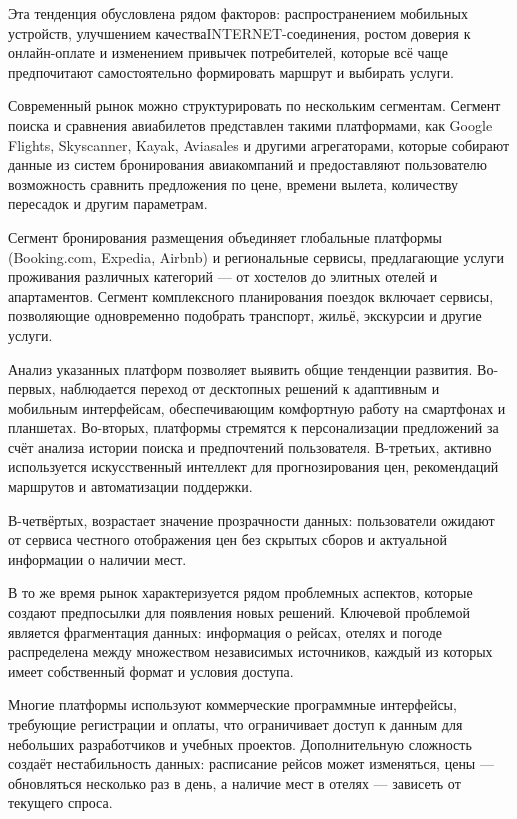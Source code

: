 \documentclass[14pt,a4paper,oneside]{extreport}
\begin{document}
Эта тенденция обусловлена рядом факторов: распространением мобильных устройств, улучшением качестваINTERNET-соединения, ростом доверия к онлайн-оплате и изменением привычек потребителей, которые всё чаще предпочитают самостоятельно формировать маршрут и выбирать услуги.

Современный рынок можно структурировать по нескольким сегментам. Сегмент поиска и сравнения авиабилетов представлен такими платформами, как Google Flights, Skyscanner, Kayak, Aviasales и другими агрегаторами, которые собирают данные из систем бронирования авиакомпаний и предоставляют пользователю возможность сравнить предложения по цене, времени вылета, количеству пересадок и другим параметрам.

Сегмент бронирования размещения объединяет глобальные платформы (Booking.com, Expedia, Airbnb) и региональные сервисы, предлагающие услуги проживания различных категорий — от хостелов до элитных отелей и апартаментов. Сегмент комплексного планирования поездок включает сервисы, позволяющие одновременно подобрать транспорт, жильё, экскурсии и другие услуги.

Анализ указанных платформ позволяет выявить общие тенденции развития. Во-первых, наблюдается переход от десктопных решений к адаптивным и мобильным интерфейсам, обеспечивающим комфортную работу на смартфонах и планшетах. Во-вторых, платформы стремятся к персонализации предложений за счёт анализа истории поиска и предпочтений пользователя. В-третьих, активно используется искусственный интеллект для прогнозирования цен, рекомендаций маршрутов и автоматизации поддержки.

В-четвёртых, возрастает значение прозрачности данных: пользователи ожидают от сервиса честного отображения цен без скрытых сборов и актуальной информации о наличии мест.

В то же время рынок характеризуется рядом проблемных аспектов, которые создают предпосылки для появления новых решений. Ключевой проблемой является фрагментация данных: информация о рейсах, отелях и погоде распределена между множеством независимых источников, каждый из которых имеет собственный формат и условия доступа.

Многие платформы используют коммерческие программные интерфейсы, требующие регистрации и оплаты, что ограничивает доступ к данным для небольших разработчиков и учебных проектов. Дополнительную сложность создаёт нестабильность данных: расписание рейсов может изменяться, цены — обновляться несколько раз в день, а наличие мест в отелях — зависеть от текущего спроса.
\end{document}
